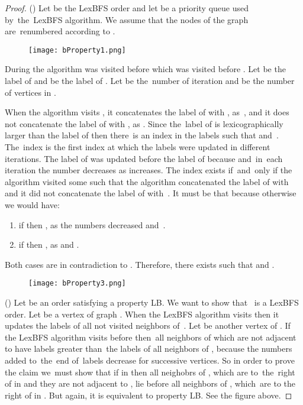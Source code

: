 \documentclass[a4paper, 11pt]{article}
\begin{document}
\begin{proof}
    () Let  be the LexBFS order and let  be a priority queue used 
    by~the~LexBFS algorithm. We assume that the nodes of the graph  are~renumbered according to . 
    
    \begin{figure}[h]
        \begin{center}
            \texttt{[image: bProperty1.png]}
        \end{center}
    \end{figure}

    During the algorithm  was visited before  which was visited before .
    Let  be the label of  and  be the label of .
    Let  be the~number of iteration and  be the number of vertices in .
    
    When the algorithm visits , it concatenates the label of  with \text{}, as~, 
    and it does not concatenate the label of  with , as \text{}. Since the~label 
    of  is lexicographically larger than the label of  then there~is an index  in 
    the labels such that  and~. The~index  
    is the first index at which the labels were updated in different iterations. The label of  
    was updated before the label of  because  and~in~each iteration the 
    number  decreases as  increases. The  index exists if~and~only if the algorithm 
    visited some  such that the algorithm concatenated the label of  with  and 
    it did not concatenate the label of  with~. It must be that  because 
    otherwise we would have:

    \begin{enumerate}
        \item if  then , as the numbers  decreased and~.
        \item if  then , as  and .
    \end{enumerate}
    Both cases are in contradiction to . Therefore, there exists  such that 
     and . 

    \begin{figure}[h]
        \begin{center}
            \texttt{[image: bProperty3.png]}
        \end{center}
    \end{figure}
   
    () 
    Let  be an order satisfying a property LB. We want to show that~ is a LexBFS
    order. Let  be a vertex of graph . When the LexBFS algorithm visits  then it updates 
    the labels of all not visited neighbors of~. Let  be another vertex of . 
    If the LexBFS algorithm visits  before  then~all neighbors of  which are not adjacent 
    to  have labels greater than~the labels of all neighbors of , because the numbers 
    added to~the~end of~labels decrease for successive vertices. So in order to prove the claim 
    we~must show that if  in  then all neighobrs of , which are to~the~right of 
    in  and they are not adjacent to , lie before all neighbors of , which~are to the right
    of  in . But again, it is equivalent to property LB. See the figure above.

\end{proof}
\end{document}
